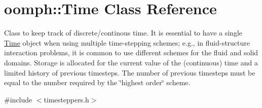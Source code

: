 \hypertarget{classoomph_1_1Time}{}\section{oomph\+:\+:Time Class Reference}
\label{classoomph_1_1Time}


Class to keep track of discrete/continous time. It is essential to have a single \hyperlink{classoomph_1_1Time}{Time} object when using multiple time-\/stepping schemes; e.\+g., in fluid-\/structure interaction problems, it is common to use different schemes for the fluid and solid domains. Storage is allocated for the current value of the (continuous) time and a limited history of previous timesteps. The number of previous timesteps must be equal to the number required by the \char`\"{}highest order\char`\"{} scheme.  




{\ttfamily \#include $<$timesteppers.\+h$>$}

